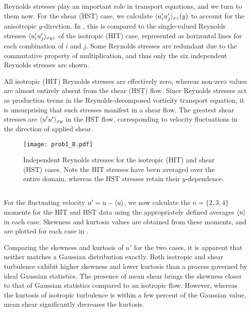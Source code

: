 \documentclass[11pt]{article}
\begin{document}
\subsection{}

Reynolds stresses play an important role in transport equations, and we turn to them now. For the shear (HST) case, we calculate $\langle u_i' u_j' \rangle_{xz}(y)$ to account for the anisotropic $y$-direction. In , this is compared to the single-valued Reynolds stresses $\langle u_i' u_j' \rangle_{xyz}$ of the isotropic (HIT) case, represented as horizontal lines for each combination of $i$ and $j$. Some Reynolds stresses are redundant due to the commutative property of multiplication, and thus only the six independent Reynolds stresses are shown.

All isotropic (HIT) Reynolds stresses are effectively zero, whereas non-zero values are almost entirely absent from the shear (HST) flow. Since Reynolds stresses act as production terms in the Reynolds-decomposed vorticity transport equation, it is unsurprising that such stresses manifest in a shear flow. The greatest shear stresses are $\langle u'u' \rangle_{xy}$ in the HST flow, corresponding to velocity fluctuations in the direction of applied shear.

\begin{figure}[t]
\centering
\texttt{[image: prob1\_8.pdf]}
\\[6pt]
\caption{Independent Reynolds stresses for the isotropic (HIT) and shear (HST) cases. Note the HIT stresses have been averaged over the entire domain, whereas the HST stresses retain their $y$-dependence.}
\label{fig:prob_1_8_reynolds_stresses}
\end{figure}

\subsection{}

For the fluctuating velocity $u' = u - \langle u \rangle$, we now calculate the $n=\{2,3,4\}$ moments for the HIT and HST data using the appropriately defined averages $\left< u \right>$ in each case. Skewness and kurtosis values are obtained from these moments, and are plotted for each case in .

Comparing the skewness and kurtosis of $u'$ for the two cases, it is apparent that neither matches a Gaussian distribution exactly. Both isotropic and shear turbulence exhibit higher skewness and lower kurtosis than a process governed by ideal Gaussian statistics. The presence of mean shear brings the skewness closer to that of Gaussian statistics compared to an isotropic flow. However, whereas the kurtosis of isotropic turbulence is within a few percent of the Gaussian value, mean shear significantly decreases the kurtosis.
\end{document}
